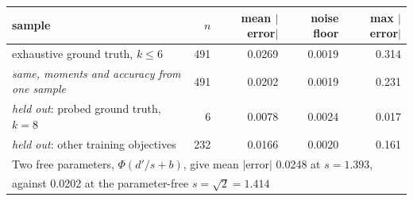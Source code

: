 \begin{tabular}{lrrrr}
\toprule
sample & $n$ & mean $|$error$|$ & noise floor & max $|$error$|$ \\
\midrule
exhaustive ground truth, $k\!\le\!6$ & 491 & 0.0269 & 0.0019 & 0.314 \\
\quad \emph{same, moments and accuracy from one sample} & 491 & 0.0202 & 0.0019 & 0.231 \\
\midrule
\emph{held out}: probed ground truth, $k\!=\!8$ & 6 & 0.0078 & 0.0024 & 0.017 \\
\emph{held out}: other training objectives & 232 & 0.0166 & 0.0020 & 0.161 \\
\midrule
\multicolumn{5}{l}{Two free parameters, $\Phi(d'/s + b)$, give mean $|$error$|$ 0.0248 at $s = 1.393$,} \\
\multicolumn{5}{l}{\quad against 0.0202 at the parameter-free $s = \sqrt{2} = 1.414$} \\
\bottomrule
\end{tabular}